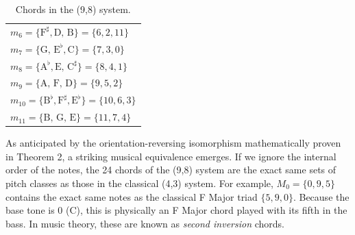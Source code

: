\documentclass[11pt,letterpaper]{amsart}
\begin{document}
{\begin{table}[H]
\begin{minipage}{0.48\textwidth}
\begin{tabular}{l}
        $m_6 = \{\text{F}^\sharp, \text{D, B}\} = \{6, 2, 11\}$ \\
        $m_7 = \{\text{G, E}^\flat, \text{C}\} = \{7, 3, 0\}$ \\
        $m_8 = \{\text{A}^\flat, \text{E, C}^\sharp\} = \{8, 4, 1\}$ \\
        $m_9 = \{\text{A, F, D}\} = \{9, 5, 2\}$ \\
        $m_{10} = \{\text{B}^\flat, \text{F}^\sharp, \text{E}^\flat\} = \{10, 6, 3\}$ \\
        $m_{11} = \{\text{B, G, E}\} = \{11, 7, 4\}$ \\
        \bottomrule
        \end{tabular}
    \end{minipage}
    \caption{Chords in the (9,8) system.}
\end{table}}

As anticipated by the orientation-reversing isomorphism mathematically proven in Theorem 2, a striking musical equivalence emerges. If we ignore the internal order of the notes, the 24 chords of the (9,8) system are the exact same sets of pitch classes as those in the classical (4,3) system. For example, $M_0 = \{0, 9, 5\}$ contains the exact same notes as the classical F Major triad $\{5, 9, 0\}$. Because the base tone is 0 (C), this is physically an F Major chord played with its fifth in the bass. In music theory, these are known as \textit{second inversion} chords. 
\end{document}
